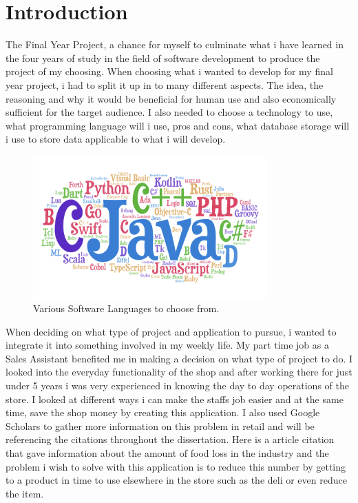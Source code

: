 \chapter{Introduction}
The Final Year Project, a chance for myself to culminate what i have learned in the four years of study in the field of software development to produce the project of my choosing. When choosing what i wanted to develop for my final year project, i had to split it up in to many different aspects. The idea, the reasoning and why it would be beneficial for human use and also economically sufficient for the target audience. I also needed to choose a technology to use, what programming language will i use, pros and cons, what database storage will i use to store data applicable to what i will develop.  

\begin{figure}[h!]
	\caption{Various Software Languages to choose from.}
	\label{image:progLanguages}
	\centering
	\includegraphics[width=0.8\textwidth]{images/progLanguages.png}
\end{figure}	

\newpage

When deciding on what type of project and application to pursue, i wanted to integrate it into something involved in my weekly life. My part time job as a Sales Assistant benefited me in making a decision on what type of project to do. I looked into the everyday functionality of the shop and after working there for just under 5 years i was very experienced in knowing the day to day operations of the store. I looked at different ways i can make the staffs job easier and at the same time, save the shop money by creating this application. I also used Google Scholars to gather more information on this problem in retail and will be referencing the citations throughout the dissertation. Here is a article citation that gave information about the amount of food loss in the industry and the problem i wish to solve with this application is to reduce this number by getting to a product in time to use elsewhere in the store such as the deli or even reduce the item. \cite{lebersorger2014food}
\newline

